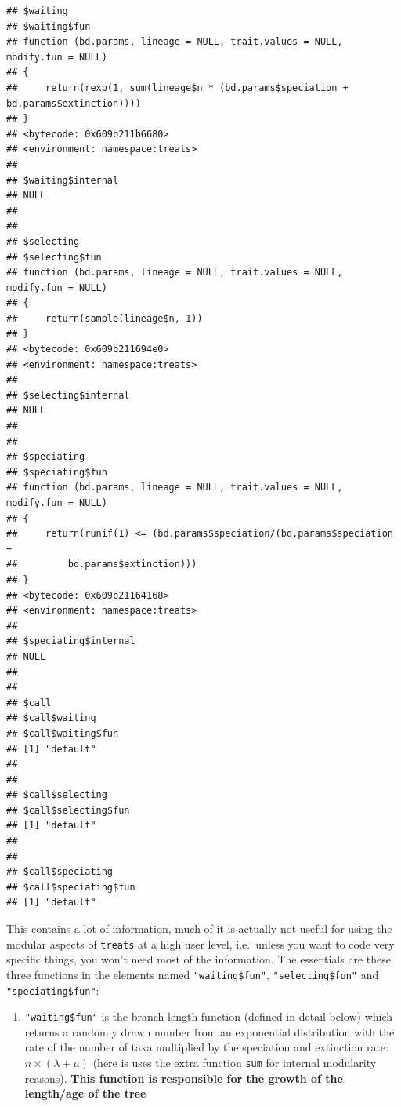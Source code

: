 \documentclass[
]{book}
\newenvironment{Shaded}{\begin{snugshade}}{\end{snugshade}}
\newcommand{\DecValTok}[1]{\textcolor[rgb]{0.00,0.00,0.81}{#1}}
\newcommand{\KeywordTok}[1]{\textcolor[rgb]{0.13,0.29,0.53}{\textbf{#1}}}
\newcommand{\NormalTok}[1]{#1}
\newcommand{\OperatorTok}[1]{\textcolor[rgb]{0.81,0.36,0.00}{\textbf{#1}}}
\newcommand{\StringTok}[1]{\textcolor[rgb]{0.31,0.60,0.02}{#1}}
\providecommand{\tightlist}{%
  \setlength{\itemsep}{0pt}\setlength{\parskip}{0pt}}
\begin{document}
\begin{verbatim}
## $waiting
## $waiting$fun
## function (bd.params, lineage = NULL, trait.values = NULL, modify.fun = NULL) 
## {
##     return(rexp(1, sum(lineage$n * (bd.params$speciation + bd.params$extinction))))
## }
## <bytecode: 0x609b211b6680>
## <environment: namespace:treats>
## 
## $waiting$internal
## NULL
## 
## 
## $selecting
## $selecting$fun
## function (bd.params, lineage = NULL, trait.values = NULL, modify.fun = NULL) 
## {
##     return(sample(lineage$n, 1))
## }
## <bytecode: 0x609b211694e0>
## <environment: namespace:treats>
## 
## $selecting$internal
## NULL
## 
## 
## $speciating
## $speciating$fun
## function (bd.params, lineage = NULL, trait.values = NULL, modify.fun = NULL) 
## {
##     return(runif(1) <= (bd.params$speciation/(bd.params$speciation + 
##         bd.params$extinction)))
## }
## <bytecode: 0x609b21164168>
## <environment: namespace:treats>
## 
## $speciating$internal
## NULL
## 
## 
## $call
## $call$waiting
## $call$waiting$fun
## [1] "default"
## 
## 
## $call$selecting
## $call$selecting$fun
## [1] "default"
## 
## 
## $call$speciating
## $call$speciating$fun
## [1] "default"
\end{verbatim}

This contains a lot of information, much of it is actually not useful for using the modular aspects of \texttt{treats} at a high user level, i.e.~unless you want to code very specific things, you won't need most of the information. The essentials are these three functions in the elements named \texttt{"waiting\$fun"}, \texttt{"selecting\$fun"} and \texttt{"speciating\$fun"}:

\begin{enumerate}
\def\labelenumi{\arabic{enumi}.}
\tightlist
\item
  \texttt{"waiting\$fun"} is the branch length function (defined in detail below) which returns a randomly drawn number from an exponential distribution with the rate of the number of taxa multiplied by the speciation and extinction rate: \(n \times (\lambda + \mu)\) (here is uses the extra function \texttt{sum} for internal modularity reasons). \textbf{This function is responsible for the growth of the length/age of the tree}
\end{enumerate}

\begin{Shaded}
\end{Shaded}
\end{document}
